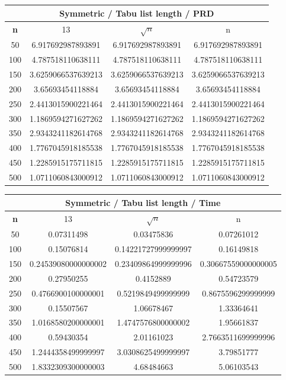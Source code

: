 \documentclass{article}
\begin{document}
\begin{center}
\begin{tabular}{|c|c|c|c|}
\hline
\multicolumn{4}{|c|}{\textbf{Symmetric / Tabu list length / PRD}}\\
\hline
\textbf{n} & 13 & $\sqrt{n}$ & n\\
\hline
50 & 6.917692987893891 & 6.917692987893891 & 6.917692987893891\\
\hline
100 & 4.787518110638111 & 4.787518110638111 & 4.787518110638111\\
\hline
150 & 3.6259066537639213 & 3.6259066537639213 & 3.6259066537639213\\
\hline
200 & 3.65693454118884 & 3.65693454118884 & 3.65693454118884\\
\hline
250 & 2.4413015900221464 & 2.4413015900221464 & 2.4413015900221464\\
\hline
300 & 1.1869594271627262 & 1.1869594271627262 & 1.1869594271627262\\
\hline
350 & 2.9343241182614768 & 2.9343241182614768 & 2.9343241182614768\\
\hline
400 & 1.7767045918185538 & 1.7767045918185538 & 1.7767045918185538\\
\hline
450 & 1.2285915175711815 & 1.2285915175711815 & 1.2285915175711815\\
\hline
500 & 1.0711060843000912 & 1.0711060843000912 & 1.0711060843000912\\
\hline
\end{tabular}
\end{center}


\begin{center}
\begin{tabular}{|c|c|c|c|}
\hline
\multicolumn{4}{|c|}{\textbf{Symmetric / Tabu list length / Time}}\\
\hline
\textbf{n} & 13 & $\sqrt{n}$ & n\\
\hline
50 & 0.07311498 & 0.03475836 & 0.07261012\\
\hline
100 & 0.15076814 & 0.14221727999999997 & 0.16149818\\
\hline
150 & 0.24539080000000002 & 0.23409864999999996 & 0.30667559000000005\\
\hline
200 & 0.27950255 & 0.4152889 & 0.54723579\\
\hline
250 & 0.4766900100000001 & 0.5219849499999999 & 0.8675596299999999\\
\hline
300 & 0.15507567 & 1.06678467 & 1.33364641\\
\hline
350 & 1.0168580200000001 & 1.4747576800000002 & 1.95661837\\
\hline
400 & 0.59430354 & 2.01161023 & 2.7663511699999996\\
\hline
450 & 1.2444358499999997 & 3.0308625499999997 & 3.79851777\\
\hline
500 & 1.8332309300000003 & 4.68484663 & 5.06103543\\
\hline
\end{tabular}
\end{center}
\end{document}
